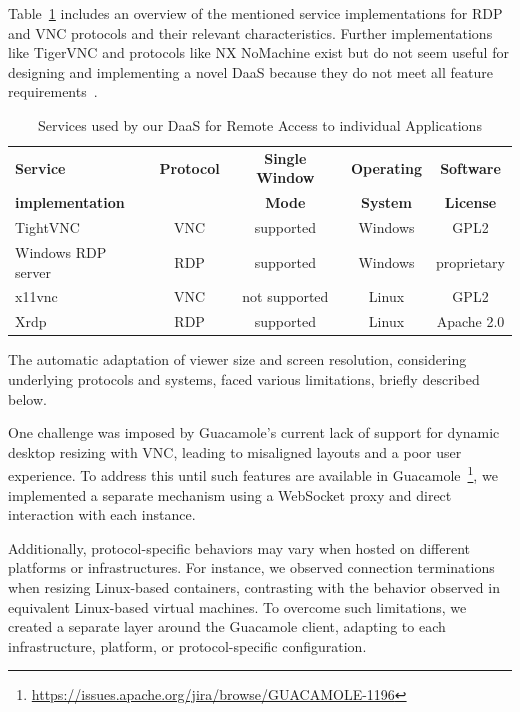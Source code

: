 \documentclass[runningheads]{llncs}
\begin{document}
Table~\ref{tab:DaaS_Services_Overview} includes an overview
of the mentioned service implementations for RDP and VNC protocols
and their relevant characteristics.
Further implementations like TigerVNC and protocols like NX NoMachine exist
but do not seem useful for designing and implementing a novel DaaS because
they do not meet all feature requirements~\cite{OJCC_2023v8i1n01_Baun}.

\begin{table}
	\centering
	\caption{Services used by our DaaS for Remote Access to individual Applications}
	\begin{tabular}{|l|c|c|c|c|}
		\hline
		\textbf{Service}        & \textbf{Protocol} & \textbf{Single Window} & \textbf{Operating} & \textbf{Software} \\
		\textbf{implementation} &                   & \textbf{Mode}          & \textbf{System}    & \textbf{License}  \\
		\hline
		TightVNC                & VNC               & supported              & Windows            & GPL2              \\
		\hline
		Windows RDP server      & RDP               & supported              & Windows            & proprietary       \\
		\hline
		x11vnc                  & VNC               & not supported          & Linux              & GPL2              \\
		\hline
		Xrdp                    & RDP               & supported              & Linux              & Apache 2.0        \\
		\hline
	\end{tabular}
	\label{tab:DaaS_Services_Overview}
\end{table}

The automatic adaptation of viewer size and screen resolution,
considering underlying protocols and systems,
faced various limitations, briefly described below.

One challenge was imposed by Guacamole's current lack of support
for dynamic desktop resizing with VNC,
leading to misaligned layouts and a poor user experience.
To address this until such features are available in
Guacamole~\footnote{\url{https://issues.apache.org/jira/browse/GUACAMOLE-1196}},
we implemented a separate mechanism using a WebSocket proxy
and direct interaction with each instance.

Additionally, protocol-specific behaviors may vary
when hosted on different platforms or infrastructures.
For instance, we observed connection terminations when resizing Linux-based containers,
contrasting with the behavior observed in equivalent Linux-based virtual machines.
To overcome such limitations, we created a separate layer around the Guacamole client,
adapting to each infrastructure, platform, or protocol-specific configuration.
\end{document}
